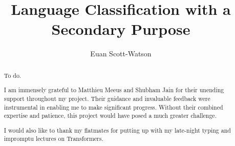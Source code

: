\documentclass[a4paper, twoside]{report}
\title{Language Classification with a Secondary Purpose}
\author{Euan Scott-Watson}
\begin{document}


\begin{abstract}
    To do.
\end{abstract}

\renewcommand{\abstractname}{Acknowledgements}
\begin{abstract}
    I am immensely grateful to Matthieu Meeus and Shubham Jain for their unending support throughout my project. Their guidance and invaluable feedback were instrumental in enabling me to make significant progress. Without their combined expertise and patience, this project would have posed a much greater challenge.

    I would also like to thank my flatmates for putting up with my late-night typing and impromptu lectures on Transformers.
\end{abstract}

\tableofcontents












\end{document}
